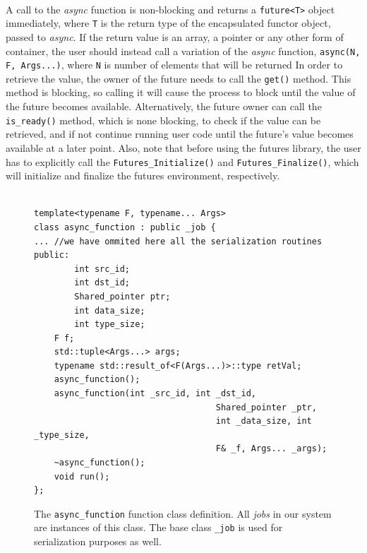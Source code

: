 \paragraph{}
A call to the \emph{async} function is non-blocking and returns a \texttt{future<T>} object immediately, 
where \texttt{T} is the return type of the encapsulated functor object, passed to \emph{async}.
 If the return value is an array, a pointer or any other form of container, the user
should instead call a variation of the \emph{async} function, \texttt{async(N, F, Args...)}, 
where \texttt{N} is number of elements that will be returned 
In order to retrieve the value,
the owner of the future needs to call the \texttt{get()} method.  This method is blocking, so calling it will cause the 
process to block until the value of the future becomes available.  Alternatively, the future owner can call the
\texttt{is\_ready()} method, which is none blocking, to check if the value can be retrieved, and if not continue running
user code until the future's value becomes available at a later point.  Also, note that before using
the futures library, the user has to explicitly call the \texttt{Futures\_Initialize()} and \texttt{Futures\_Finalize()},
which will initialize and finalize the futures environment, respectively. 
    
\begin{figure}[!ht]
\begin{lstlisting}

template<typename F, typename... Args>
class async_function : public _job {
... //we have ommited here all the serialization routines
public:
		int src_id;
		int dst_id;
		Shared_pointer ptr;
		int data_size;
		int type_size;
    F f;
  	std::tuple<Args...> args;
    typename std::result_of<F(Args...)>::type retVal;
    async_function();
    async_function(int _src_id, int _dst_id, 
									Shared_pointer _ptr, 
									int _data_size, int _type_size,
									F& _f, Args... _args);
    ~async_function();
    void run();
};
\end{lstlisting}
\caption{The \texttt{async\_function} function class definition.  All \emph{jobs} in our system are
instances of this class.  The base class \texttt{\_job} is used for serialization purposes as well.}
\label{lst:async_function}
\end{figure}

